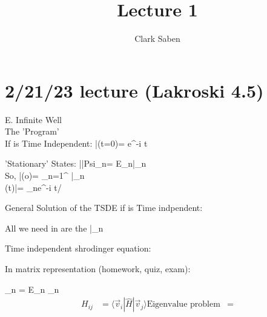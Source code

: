 \documentclass{article}
\title{Lecture 1}
\author{Clark Saben}
\begin{document}
\newcommand{\pz}{\ket{\vb{+z}}}
\newcommand{\nz}{\ket{\vb{-z}}}
\newcommand{\px}{\ket{\vb{+x}}}
\newcommand{\nx}{\ket{\vb{-x}}}
\newcommand{\py}{\ket{\vb{+z}}}
\newcommand{\ny}{\ket{\vb{-y}}}

\newcommand{\pxexpr}{ \frac{1}{\sqrt{2}} \pz + \frac{1}{\sqrt{2}} \nz}
\newcommand{\nxexpr}{ \frac{1}{\sqrt{2}} \pz - \frac{1}{\sqrt{2}} \nz}
\newcommand{\pyexpr}{ \frac{1}{\sqrt{2}} \pz + \frac{i}{\sqrt{2}} \nz}
\newcommand{\nyexpr}{ \frac{1}{\sqrt{2}} \pz - \frac{i}{\sqrt{2}} \nz}
\maketitle

\section{2/21/23 lecture (Lakroski 4.5)}

E. Infinite Well\\

The 'Program'\\

If  is Time Independent:
|\Psi(t=0)\rangle = e^{-i  t \hbar}

'Stationary' States: ||Psi_{n}\rangle = E_{n}|\Psi_{n}\rangle\\

So,
|\Psi(o)\rangle = \sum_{n=1}^{\infty} \langle{}|\Psi_{n}\rangle\\

\implies {}(t)|\rangle = \sum_{n}e^{-i  t/ \hbar} 


General Solution of the TSDE if  is Time indpendent:


All we need in are the |\Psi_{n}\rangle

Time independent  shrodinger equation:


In matrix representation (homework, quiz, exam):

_n = E_n _n
\begin{align*}
	{H_{ij}} &= \langle\vec{v}_i|\hat{H}|\vec{v}_j\rangle \text{Eigenvalue problem}
		 &= %
\end{align*}
\end{document}
